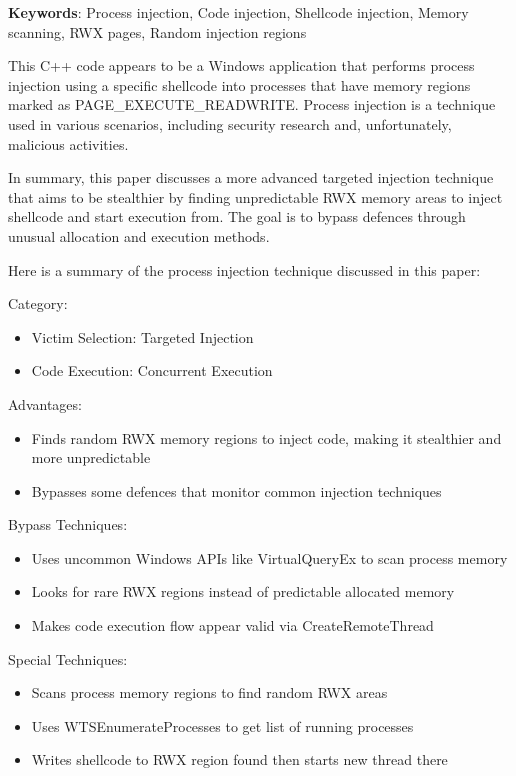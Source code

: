 \documentclass{article}
\begin{document}
\textbf{Keywords}: Process injection, Code injection, Shellcode injection, Memory scanning, RWX pages, Random injection regions

This C++ code appears to be a Windows application that performs process injection using a specific shellcode into processes that have memory regions marked as PAGE\_EXECUTE\_READWRITE. Process injection is a technique used in various scenarios, including security research and, unfortunately, malicious activities.


In summary, this paper discusses a more advanced targeted injection technique that aims to be stealthier by finding unpredictable RWX memory areas to inject shellcode and start execution from. The goal is to bypass defences through unusual allocation and execution methods.

Here is a summary of the process injection technique discussed in this paper:

Category:
\begin{itemize}
\item Victim Selection: Targeted Injection
\item Code Execution: Concurrent Execution
\end{itemize}

Advantages:
\begin{itemize}
\item Finds random RWX memory regions to inject code, making it stealthier and more unpredictable
\item Bypasses some defences that monitor common injection techniques
\end{itemize}

Bypass Techniques:
\begin{itemize}
\item Uses uncommon Windows APIs like VirtualQueryEx to scan process memory
\item Looks for rare RWX regions instead of predictable allocated memory
\item Makes code execution flow appear valid via CreateRemoteThread
\end{itemize}

Special Techniques:
\begin{itemize}
\item Scans process memory regions to find random RWX areas
\item Uses WTSEnumerateProcesses to get list of running processes
\item Writes shellcode to RWX region found then starts new thread there
\end{itemize}
\end{document}
